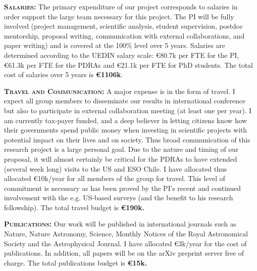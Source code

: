 \smallskip 
\smallskip
\noindent \textbf{\textsc{Salaries:}} The primary expenditure of our
project corresponds to salaries in order support the large team
necessary for this project.  The PI will be fully involved (project
management, scientific analysis, student supervision, postdoc
mentorship, proposal writing, communication with external
collaborations, and paper writing) and is covered at the 100\% level
over 5 years.  Salaries are determined according to the UEDIN salary
scale: \euro80.7k per FTE for the PI, \euro61.3k per FTE for the
PDRAs and \euro21.1k per FTE for PhD students.  The total cost of
salaries over 5 years is {\bf \euro 1106k}.

\smallskip 
\smallskip
\noindent \textbf{\textsc{Travel and Communication:}} 
A major expense is in the form of travel. I expect all group members
to disseminate our results in international conference but also to
participate in external collaboration meeting (at least one per year).
I am currently tax-payer funded, and a deep believer in letting
citizens know how their governments spend public money when investing
in scientific projects with potential impact on their lives and on
society.  Thus broad communication of this research project is a large
personal goal. Due to the nature and timing of our proposal, it will
almost certainly be critical for the PDRAs to have extended (several
week long) visits to the US and ESO Chile. I have allocated thus
allocated \euro10k/year for all members of the group for travel. This
level of commitment is necessary as has been proved by the PI's recent
and continued involvement with the e.g.  US-based surveys (and the
benefit to his research fellowship). The total travel budget is {\bf
\euro190k.}

\smallskip
\smallskip
\noindent
\textbf{\textsc{Publications:}}
Our work will be published in international journals such as Nature,
Nature Astronomy, Science, Monthly Notices of the Royal Astronomical
Society and the Astrophysical Journal. I have allocated \euro3k/year
for the cost of publications. In addition, all papers will be on the
arXiv preprint server free of charge. The total publications budget is
{\bf \euro15k.}

